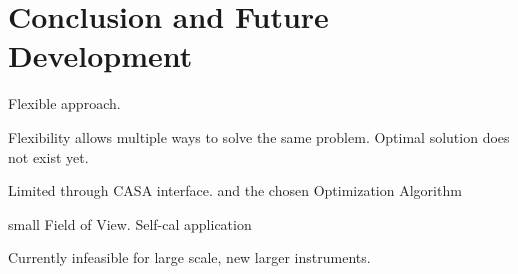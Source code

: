 \section{Conclusion and Future Development}
Flexible approach.

Flexibility allows multiple ways to solve the same problem. Optimal solution does not exist yet. 

Limited through CASA interface. and the chosen Optimization Algorithm

small Field of View. Self-cal application

Currently infeasible for large scale, new larger instruments.

